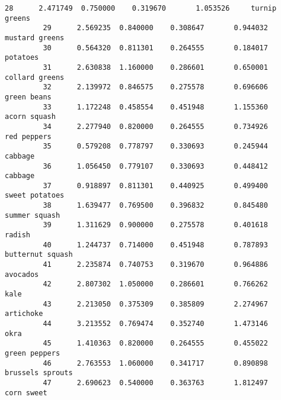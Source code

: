 \documentclass[11pt]{article}
\begin{document}
\begin{Verbatim}[commandchars=\\\{\}]
         28      2.471749  0.750000    0.319670       1.053526     turnip greens   
         29      2.569235  0.840000    0.308647       0.944032    mustard greens   
         30      0.564320  0.811301    0.264555       0.184017          potatoes   
         31      2.630838  1.160000    0.286601       0.650001    collard greens   
         32      2.139972  0.846575    0.275578       0.696606       green beans   
         33      1.172248  0.458554    0.451948       1.155360      acorn squash   
         34      2.277940  0.820000    0.264555       0.734926       red peppers   
         35      0.579208  0.778797    0.330693       0.245944           cabbage   
         36      1.056450  0.779107    0.330693       0.448412           cabbage   
         37      0.918897  0.811301    0.440925       0.499400    sweet potatoes   
         38      1.639477  0.769500    0.396832       0.845480     summer squash   
         39      1.311629  0.900000    0.275578       0.401618            radish   
         40      1.244737  0.714000    0.451948       0.787893  butternut squash   
         41      2.235874  0.740753    0.319670       0.964886          avocados   
         42      2.807302  1.050000    0.286601       0.766262              kale   
         43      2.213050  0.375309    0.385809       2.274967         artichoke   
         44      3.213552  0.769474    0.352740       1.473146              okra   
         45      1.410363  0.820000    0.264555       0.455022     green peppers   
         46      2.763553  1.060000    0.341717       0.890898  brussels sprouts   
         47      2.690623  0.540000    0.363763       1.812497        corn sweet   
         

\end{Verbatim}
\end{document}
